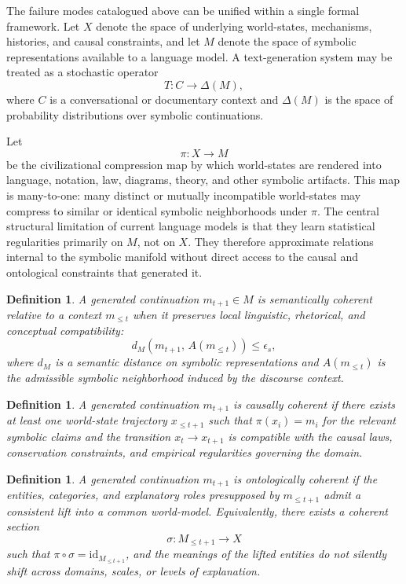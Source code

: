 \documentclass[12pt, a4paper]{article}
\newtheorem{definition}[theorem]{Definition}
\theoremstyle{remark}
\begin{document}
The failure modes catalogued above can be unified within a single formal framework. Let $X$ denote the space of underlying world-states, mechanisms, histories, and causal constraints, and let $M$ denote the space of symbolic representations available to a language model. A text-generation system may be treated as a stochastic operator
\[
T : C \to \Delta(M),
\]
where $C$ is a conversational or documentary context and $\Delta(M)$ is the space of probability distributions over symbolic continuations.

Let
\[
\pi : X \to M
\]
be the civilizational compression map by which world-states are rendered into language, notation, law, diagrams, theory, and other symbolic artifacts. This map is many-to-one: many distinct or mutually incompatible world-states may compress to similar or identical symbolic neighborhoods under $\pi$. The central structural limitation of current language models is that they learn statistical regularities primarily on $M$, not on $X$. They therefore approximate relations internal to the symbolic manifold without direct access to the causal and ontological constraints that generated it.

\begin{definition}
A generated continuation $m_{t+1} \in M$ is \emph{semantically coherent} relative to a context $m_{\leq t}$ when it preserves local linguistic, rhetorical, and conceptual compatibility:
\[
d_M(m_{t+1},\, A(m_{\leq t})) \leq \epsilon_s,
\]
where $d_M$ is a semantic distance on symbolic representations and $A(m_{\leq t})$ is the admissible symbolic neighborhood induced by the discourse context.
\end{definition}

\begin{definition}
A generated continuation $m_{t+1}$ is \emph{causally coherent} if there exists at least one world-state trajectory $x_{\leq t+1}$ such that $\pi(x_i) = m_i$ for the relevant symbolic claims and the transition $x_t \to x_{t+1}$ is compatible with the causal laws, conservation constraints, and empirical regularities governing the domain.
\end{definition}

\begin{definition}
A generated continuation $m_{t+1}$ is \emph{ontologically coherent} if the entities, categories, and explanatory roles presupposed by $m_{\leq t+1}$ admit a consistent lift into a common world-model. Equivalently, there exists a coherent section
\[
\sigma : M_{\leq t+1} \to X
\]
such that $\pi \circ \sigma = \mathrm{id}_{M_{\leq t+1}}$, and the meanings of the lifted entities do not silently shift across domains, scales, or levels of explanation.
\end{definition}
\end{document}
